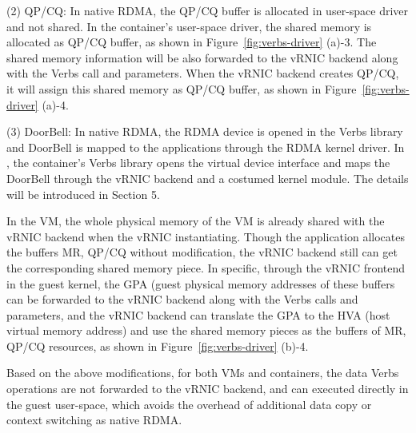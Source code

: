 (2) QP/CQ: In native RDMA, the QP/CQ buffer is allocated in user-space driver and not shared. In the container's user-space driver, the shared memory is allocated as QP/CQ buffer, as shown in Figure~\ref{fig:verbs-driver} (a)-3. The shared memory information will be also forwarded to the vRNIC backend along with the Verbs call and parameters. When the vRNIC backend creates QP/CQ, it will assign this shared memory as QP/CQ buffer, as shown in Figure~\ref{fig:verbs-driver} (a)-4.


(3) DoorBell: In native RDMA, the RDMA device is opened in the Verbs library and DoorBell is mapped to the applications through the RDMA kernel driver. In \sys, the container's Verbs library opens the virtual device interface and maps the DoorBell through the vRNIC backend and a costumed kernel module. The details will be introduced in Section 5.


In the VM, the whole physical memory of the VM is already shared with the vRNIC backend when the vRNIC instantiating. Though the application allocates the buffers MR, QP/CQ without modification, the vRNIC backend still can get the corresponding shared memory piece. In specific, through the vRNIC frontend in the guest kernel, the GPA (guest physical memory addresses of these buffers can be forwarded to the vRNIC backend along with the Verbs calls and parameters, and the vRNIC backend can translate the GPA to the HVA (host virtual memory address) and use the shared memory pieces as the buffers of MR, QP/CQ resources, as shown in Figure~\ref{fig:verbs-driver} (b)-4.


Based on the above modifications, for both VMs and containers,  the data Verbs operations are not forwarded to the vRNIC backend, and can executed directly in the guest user-space, which avoids the overhead of additional data copy or context switching as native RDMA.

